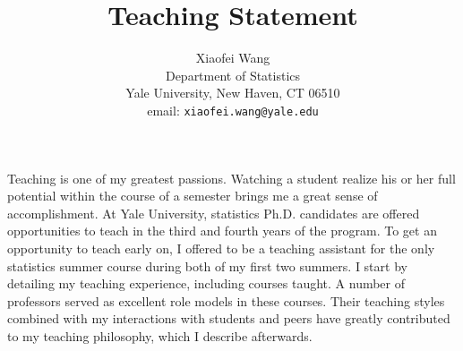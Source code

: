 \documentclass[11pt]{article}
\begin{document}
\title{Teaching Statement}
\author{Xiaofei Wang\\
Department of Statistics \\ 
Yale University, New Haven, CT 06510  \\ 
email: \texttt{xiaofei.wang@yale.edu} }

\maketitle
Teaching is one of my greatest passions. Watching a student realize his or her full potential within the course of a semester brings me a great sense of accomplishment. 
At Yale University, statistics Ph.D. candidates are offered opportunities to teach in the third and fourth years of the program. To get an opportunity to teach early on, I offered to be a teaching assistant for the only statistics summer course during both of my first two summers. I start by detailing my teaching experience, including courses taught. A number of professors served as excellent role models in these courses. Their teaching styles combined with my interactions with students and peers have greatly contributed to my teaching philosophy, which I describe afterwards. 
\end{document}

